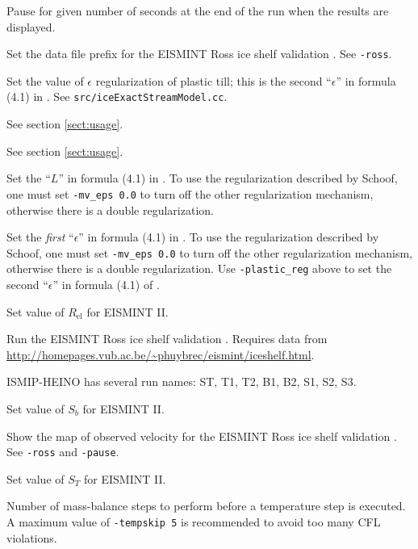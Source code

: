 \documentclass[12pt,final]{amsart}
\renewcommand{\t}[1]{\texttt{#1}}
\newcommand{\eps}{\epsilon}
\begin{document}
    Pause for given number of seconds at the end of the run when the results are displayed.

    Set the data file prefix for the EISMINT Ross ice shelf validation \cite{MacAyealetal}.  See \verb|-ross|.

    Set the value of $\eps$ regularization of plastic till; this is the second ``$\eps$'' in formula (4.1) in \cite{SchoofStream}.  See \t{src/iceExactStreamModel.cc}.

  See section \ref{sect:usage}.

  See section \ref{sect:usage}.

  Set the ``$L$'' in formula (4.1) in \cite{SchoofStream}.  To use the regularization described by Schoof, one must set \verb|-mv_eps 0.0| to turn off the other regularization mechanism, otherwise there is a double regularization.

  Set the \emph{first} ``$\eps$'' in formula (4.1) in \cite{SchoofStream}.  To use the regularization described by Schoof, one must set \verb|-mv_eps 0.0| to turn off the other regularization mechanism, otherwise there is a double regularization.  Use \verb|-plastic_reg| above to set the second ``$\eps$'' in formula (4.1) of \cite{SchoofStream}.

    Set value of $R_{\text{el}}$ for EISMINT II.

    Run the EISMINT Ross ice shelf validation \cite{MacAyealetal}.  Requires data from \url{http://homepages.vub.ac.be/~phuybrec/eismint/iceshelf.html}.

  ISMIP-HEINO has several run names: ST, T1, T2, B1, B2, S1, S2, S3.

    Set value of $S_b$ for EISMINT II.

    Show the map of observed velocity for the EISMINT Ross ice shelf validation \cite{MacAyealetal}.  See \verb|-ross| and \verb|-pause|.

    Set value of $S_T$ for EISMINT II.

  Number of mass-balance steps to perform before a temperature step is executed.  A maximum value of \verb|-tempskip 5| is recommended to avoid too many CFL violations.
\end{document}
